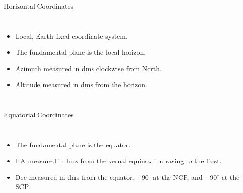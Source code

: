 \begin{frame}{Horizontal Coordinates}
  \begin{columns}[T,onlytextwidth]

    \centering

    \Large
      \begin{itemize}
        \item Local, Earth-fixed coordinate system.
        \item The fundamental plane is the local horizon.
        \item Azimuth measured in dms clockwise from North.
        \item Altitude measured in dms from the horizon.
      \end{itemize}

  \end{columns}
\end{frame}


\begin{frame}{Equatorial Coordinates}
  \begin{columns}[T,onlytextwidth]

    \centering

    \Large
      \begin{itemize}
        \item The fundamental plane is the equator.
        \item RA measured in hms from the vernal equinox increasing to the East.
        \item Dec measured in dms from the equator, $+90^{\circ}$ at the NCP, and $-90^{\circ}$ at the SCP.
      \end{itemize}

  \end{columns}
\end{frame}


